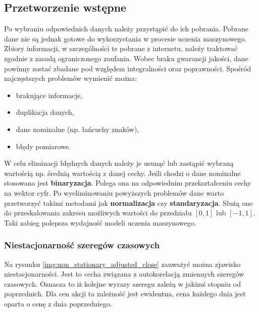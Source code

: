 \documentclass[a4paper, twoside, 11pt, openright]{article}
\begin{document}
\subsection{Przetworzenie wstępne}

Po wybraniu odpowiednich danych należy przystąpić do ich pobrania. Pobrane dane nie są jednak gotowe do wykorzystania w procesie uczenia maszynowego. Zbiory informacji, w szczególności te pobrane z internetu, należy traktować zgodnie z zasadą ograniczonego zaufania. Wobec braku gwarancji jakości, dane powinny zostać zbadane pod względem integralności oraz poprawności. Spośród najczęstszych problemów wymienić można: 
\begin{itemize}
    \item brakujące informacje,
    \item duplikacja danych,
    \item dane nominalne (np. łańcuchy znaków),
    \item błędy pomiarowe.
\end{itemize}
W celu eliminacji błędnych danych należy je usunąć lub zastąpić wybraną wartością np. średnią wartością z danej cechy. Jeśli chodzi o dane nominalne stosowana jest \textbf{binaryzacja}. Polega ona na odpowiednim przekształceniu cechy na wektor cyfr. Po wyeliminowaniu powyższych problemów dane warto przetworzyć takimi metodami jak \textbf{normalizacja} czy \textbf{standaryzacja}. Służą one do przeskalowania zakresu możliwych wartości do przedziału $[0,1]$ lub $[-1,1]$. Taki zabieg polepsza wydajność modeli uczenia maszynowego.

\bigskip

\subsubsection{Niestacjonarność szeregów czasowych}

Na rysunku \ref{img:non_stationary_adjusted_close} zauważyć można zjawisko niestacjonarności. Jest to cecha związana z autokorelacją zmiennych szeregów czasowych. Oznacza to iż kolejne wyrazy szeregu zależą w jakimś stopniu od poprzednich. Dla cen akcji ta zależność jest ewidentna, cena każdego dnia jest oparta o cenę z dnia poprzedniego. 
\end{document}
